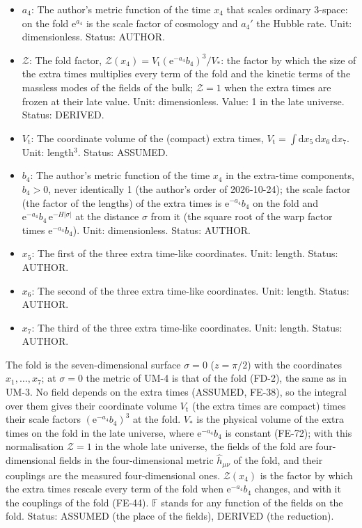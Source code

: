 \documentclass[
  10pt,
]{article}
\begin{document}
\begin{itemize}
  \(\mathrm{e}\): Euler's number, the base of the natural logarithm;
  \(\mathrm{e}^{X}\) is the exponential of \(X\). Unit: dimensionless.
  Value: 2.718281828. Status: STANDARD.
\item
  \(a_4\): The author's metric function of the time \(x_4\) that scales
  ordinary 3-space: on the fold \(\mathrm{e}^{a_4}\) is the scale factor
  of cosmology and \(a_4'\) the Hubble rate. Unit: dimensionless.
  Status: AUTHOR.
\item
  \(\mathcal{Z}\): The fold factor,
  \(\mathcal{Z}(x_4) = V_{\mathrm{t}}(\mathrm{e}^{-a_4}b_4)^3/V_*\): the
  factor by which the size of the extra times multiplies every term of
  the fold and the kinetic terms of the massless modes of the fields of
  the bulk; \(\mathcal{Z} = 1\) when the extra times are frozen at their
  late value. Unit: dimensionless. Value: 1 in the late universe.
  Status: DERIVED.
\item
  \(V_{\mathrm{t}}\): The coordinate volume of the (compact) extra
  times,
  \(V_{\mathrm{t}} = \int\mathrm{d}x_5\,\mathrm{d}x_6\,\mathrm{d}x_7\).
  Unit: length\(^3\). Status: ASSUMED.
\item
  \(b_4\): The author's metric function of the time \(x_4\) in the
  extra-time components, \(b_4 > 0\), never identically 1 (the author's
  order of 2026-10-24); the scale factor (the factor of the lengths) of
  the extra times is \(\mathrm{e}^{-a_4}b_4\) on the fold and
  \(\mathrm{e}^{-a_4}b_4\,\mathrm{e}^{-H\lvert\sigma\rvert}\) at the
  distance \(\sigma\) from it (the square root of the warp factor times
  \(\mathrm{e}^{-a_4}b_4\)). Unit: dimensionless. Status: AUTHOR.
\item
  \(x_5\): The first of the three extra time-like coordinates. Unit:
  length. Status: AUTHOR.
\item
  \(x_6\): The second of the three extra time-like coordinates. Unit:
  length. Status: AUTHOR.
\item
  \(x_7\): The third of the three extra time-like coordinates. Unit:
  length. Status: AUTHOR.
\end{itemize}

The fold is the seven-dimensional surface \(\sigma = 0\) (\(z = \pi/2\))
with the coordinates \(x_1, \dots, x_7\); at \(\sigma = 0\) the metric
of UM-4 is that of the fold (FD-2), the same as in UM-3. No field
depends on the extra times (ASSUMED, FE-38), so the integral over them
gives their coordinate volume \(V_{\mathrm{t}}\) (the extra times are
compact) times their scale factors \((\mathrm{e}^{-a_4}b_4)^3\) at the
fold. \(V_*\) is the physical volume of the extra times on the fold in
the late universe, where \(\mathrm{e}^{-a_4}b_4\) is constant (FE-72);
with this normalisation \(\mathcal{Z} = 1\) in the whole late universe,
the fields of the fold are four-dimensional fields in the
four-dimensional metric \(\hat h_{\mu\nu}\) of the fold, and their
couplings are the measured four-dimensional ones. \(\mathcal{Z}(x_4)\)
is the factor by which the extra times rescale every term of the fold
when \(\mathrm{e}^{-a_4}b_4\) changes, and with it the couplings of the
fold (FE-44). \(\mathbb{F}\) stands for any function of the fields on
the fold. Status: ASSUMED (the place of the fields), DERIVED (the
reduction).
\end{document}
